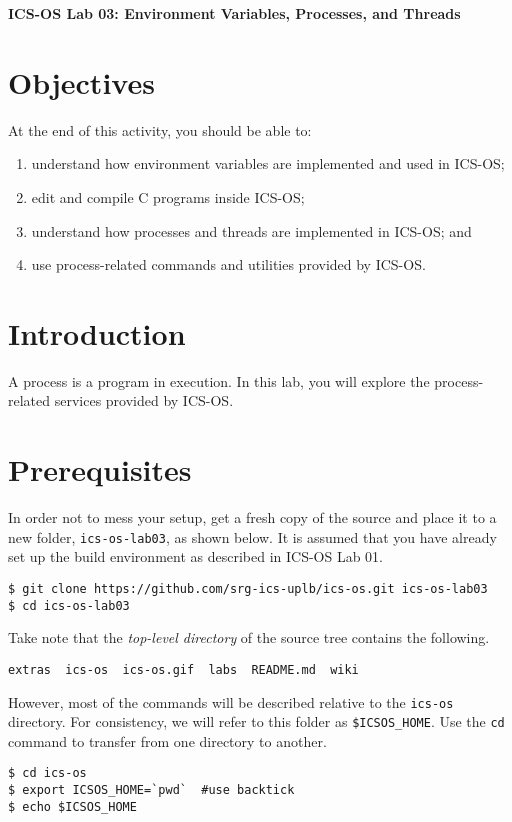 \documentclass[a4paper, 11pt,oneside]{article}
\begin{document}
\begin{center}
   {\LARGE \textbf{ICS-OS Lab 03: Environment Variables, Processes, and Threads}}
\end{center}

\section*{Objectives}
   At the end of this activity, you should be able to:
   \begin{enumerate}[itemsep=0pt,parsep=0pt]
       \item understand how environment variables are implemented and used in ICS-OS;
       \item edit and compile C programs inside ICS-OS;
       \item understand how processes and threads are implemented in ICS-OS; and
       \item use process-related commands and utilities provided by ICS-OS.
   \end{enumerate}   

\section{Introduction}
A process is a program in execution. In this lab, you will explore the process-related services provided by ICS-OS. 

\section{Prerequisites}
In order not to mess your setup, get a fresh copy of the source and place it to a new folder, \texttt{ics-os-lab03}, as shown below. It is assumed that you have already set up the build environment as described in ICS-OS Lab 01.

\begin{verbatim}
$ git clone https://github.com/srg-ics-uplb/ics-os.git ics-os-lab03
$ cd ics-os-lab03
\end{verbatim}

Take note that the \textit{top-level directory} of the source 
tree contains the following. 

\begin{verbatim}
extras  ics-os  ics-os.gif  labs  README.md  wiki
\end{verbatim}

However, most of the commands will be described relative to the \texttt{ics-os} directory.
For consistency, we will refer to this folder as \texttt{\$ICSOS\_HOME}. Use the \texttt{cd} 
command to transfer from one directory to another.
\begin{verbatim}
$ cd ics-os
$ export ICSOS_HOME=`pwd`  #use backtick
$ echo $ICSOS_HOME
\end{verbatim}
\end{document}

